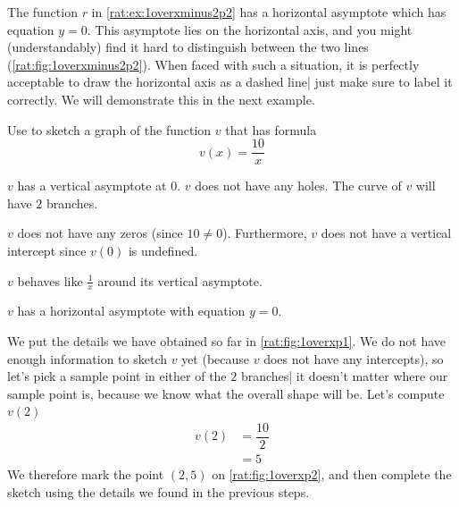  The function $r$ in \cref{rat:ex:1overxminus2p2} has a horizontal asymptote which has equation $y=0$.
 This asymptote lies on the horizontal axis, and you might (understandably) find it hard
 to distinguish between the two lines (\cref{rat:fig:1overxminus2p2}). When faced
 with such a situation, it is perfectly acceptable to draw the horizontal axis
 as a dashed line| just make sure to label it correctly. We will demonstrate this
 in the next example.

 \begin{pccexample}\label{rat:ex:1overxp1}
	 Use  to sketch a graph of the function $v$
	 that has formula
	 \[
		 v(x)=\frac{10}{x}
	 \]
	 \begin{pccsolution}
		 \begin{steps}
			 \item $v$ has a vertical asymptote at $0$. $v$ does not have
			 any holes. The curve of $v$ will have $2$ branches.
			 \item $v$ does not have any zeros (since $10\ne 0$). Furthermore, $v$
			 does not have a vertical intercept since $v(0)$ is undefined.
			 \item $v$ behaves like $\frac{1}{x}$ around its vertical asymptote.
			 \item $v$ has a horizontal asymptote with equation $y=0$.
			 \item We put the details we have obtained so far in \cref{rat:fig:1overxp1}.
			 We do not have enough information to sketch $v$ yet (because $v$ does
			 not have any intercepts), so let's pick a sample
			 point in either of the $2$ branches| it doesn't matter where our sample point
			 is, because we know what the overall shape will be. Let's compute $v(2)$
			 \begin{align*}
				 v(2) & =\dfrac{10}{2} \\
				      & = 5
			 \end{align*}
			 We therefore mark the point $(2,5)$ on \cref{rat:fig:1overxp2}, and then complete the sketch using
			 the details we found in the previous steps.
		 \end{steps}


\end{pccsolution}
\end{pccexample}
